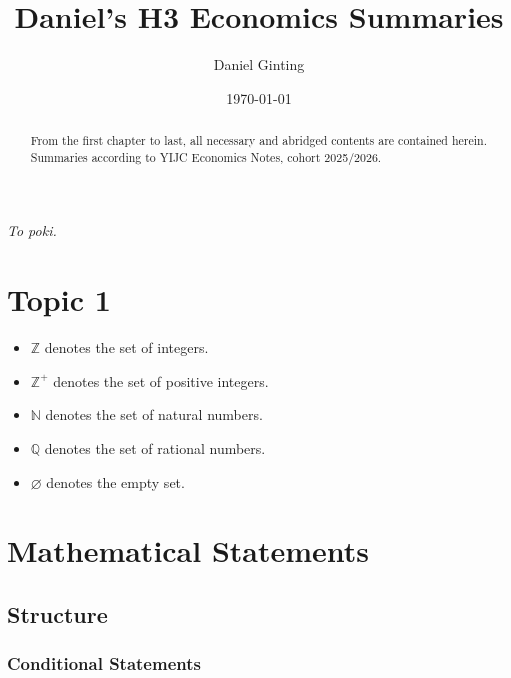 \documentclass[a4paper]{article}
\title{Daniel's H3 Economics Summaries}
\author{Daniel Ginting}
\date{\today}
\begin{document}
	
\maketitle

\newpage
\thispagestyle{empty}

\vspace*{\fill}
\begin{center}
	\emph{To poki.}
\end{center}
\vspace*{\fill}

\newpage

\begin{abstract}

From the first chapter to last, all necessary and abridged contents are contained herein. Summaries according to YIJC Economics Notes, cohort 2025/2026.

\end{abstract}




\section{Topic 1}

\begin{itemize}
	\item $\mathbb{Z}$ denotes the set of integers.
	\item $\mathbb{Z}^+$ denotes the set of positive integers.
	\item $\mathbb{N}$ denotes the set of natural numbers.
	\item $\mathbb{Q}$ denotes the set of rational numbers.
	\item $\varnothing$ denotes the empty set.
	
\end{itemize}

\section{Mathematical Statements}

\subsection{Structure}

\subsubsection{Conditional Statements}
\end{document}
